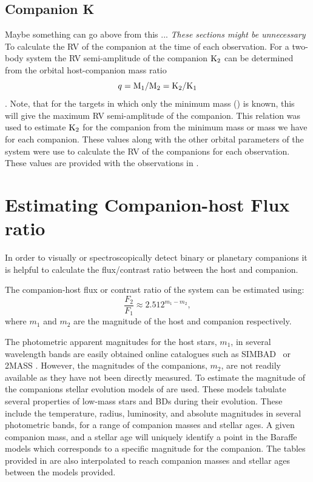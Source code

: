 \subsection{Companion K}  Maybe something can go above from this ...
\label{sec:companion_RV}
\emph{These sections might be unnecessary}\\

To calculate the {RV} of the companion at the time of each observation. For a two-body system the {RV} semi-amplitude of the companion \(\textrm{K}_{2}\) can be determined from the orbital host-companion mass ratio \[q = \textrm{M}_{1}/\textrm{M}_{2} = \textrm{K}_{2}/\textrm{K}_{1}\label{eqn:q_ratio_K2}\].
Note, that for the targets in which only the minimum mass (\mtwosini) is known, this will give the maximum {RV} semi-amplitude of the companion.
This relation was used to estimate \(\textrm{K}_{2}\) for the companion from the minimum mass or mass we have for each companion. These values along with the other orbital parameters of the system were use to calculate the {RV} of the companions for each observation. These values are provided with the observations in .




\section{Estimating Companion-host Flux ratio}
\label{sec:compaion_flux_ratio}
In order to visually or spectroscopically detect binary or planetary companions it is helpful to calculate the flux/contrast ratio between the host and companion.

The companion-host flux or contrast ratio of the system can be estimated using:
\begin{equation}
\frac{F_{2}}{F_{1}} \approx 2.512^{m_{1} - m_{2}}, \label{eqn:mag_flux_ratios}
\end{equation}
where \(m_{1}\) and \(m_{2}\) are the magnitude of the host and companion respectively.

The photometric apparent magnitudes for the host stars, \(m_{1}\), in several wavelength bands are easily obtained online catalogues such as {SIMBAD}~\citep{wenger_simbad_2000} or {2MASS} \citep{skrutskie_two_2006}.
However, the magnitudes of the companions, \(m_{2}\), are not readily available as they have not been directly measured.
To estimate the magnitude of the companions stellar evolution models of \citet{baraffe_evolutionary_2003, baraffe_new_2015} are used.
These models tabulate several properties of low-mass stars and BDs during their evolution.
These include the temperature, radius, luminosity, and absolute magnitudes in several photometric bands, for a range of companion masses and stellar ages.
A given companion mass, and a stellar age will uniquely identify a point in the Baraffe models which corresponds to a specific magnitude for the companion.
The tables provided in \citet{baraffe_evolutionary_2003, baraffe_new_2015} are also interpolated to reach companion masses and stellar ages between the models provided.

